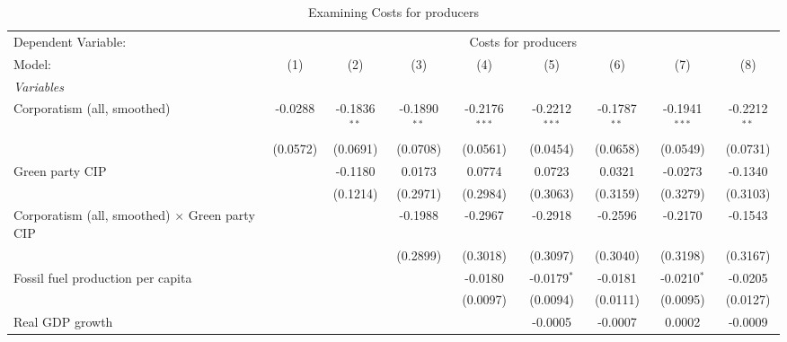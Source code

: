 
\begin{table}[htbp]
   \caption{Examining Costs for producers}
   \centering
   \begin{tabular}{lcccccccc}
      \tabularnewline \midrule \midrule
      Dependent Variable: & \multicolumn{8}{c}{Costs for producers}\\
      Model:                                                & (1)      & (2)            & (3)            & (4)             & (5)             & (6)            & (7)             & (8)\\  
      \midrule
      \emph{Variables}\\
      Corporatism (all, smoothed)                           & -0.0288  & -0.1836$^{**}$ & -0.1890$^{**}$ & -0.2176$^{***}$ & -0.2212$^{***}$ & -0.1787$^{**}$ & -0.1941$^{***}$ & -0.2212$^{**}$\\   
                                                            & (0.0572) & (0.0691)       & (0.0708)       & (0.0561)        & (0.0454)        & (0.0658)       & (0.0549)        & (0.0731)\\   
      Green party CIP                                       &          & -0.1180        & 0.0173         & 0.0774          & 0.0723          & 0.0321         & -0.0273         & -0.1340\\   
                                                            &          & (0.1214)       & (0.2971)       & (0.2984)        & (0.3063)        & (0.3159)       & (0.3279)        & (0.3103)\\   
      Corporatism (all, smoothed) $\times$ Green party CIP  &          &                & -0.1988        & -0.2967         & -0.2918         & -0.2596        & -0.2170         & -0.1543\\   
                                                            &          &                & (0.2899)       & (0.3018)        & (0.3097)        & (0.3040)       & (0.3198)        & (0.3167)\\   
      Fossil fuel production per capita                     &          &                &                & -0.0180         & -0.0179$^{*}$   & -0.0181        & -0.0210$^{*}$   & -0.0205\\   
                                                            &          &                &                & (0.0097)        & (0.0094)        & (0.0111)       & (0.0095)        & (0.0127)\\   
      Real GDP growth                                       &          &                &                &                 & -0.0005         & -0.0007        & 0.0002          & -0.0009\\   

\end{tabular}
\end{table}

